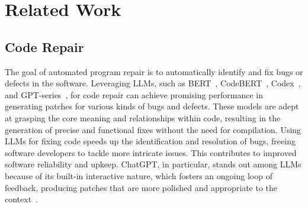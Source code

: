 \section{Related Work}
\label{section: related work}

\subsection{Code Repair} 

The goal of automated program repair is to automatically identify and fix bugs or defects in the software.
Leveraging LLMs, such as BERT~\cite{zhang2024appt}, CodeBERT~\cite{le2023invalidator}, Codex~\cite{fan2023automated,jin2023inferfix,wu2023effective}, and GPT-series~\cite{lajko2022towards,xia2023keep,xia2023conversational,sobania2023analysis}, for code repair can achieve promising performance in generating patches for various kinds of bugs and defects.
These models are adept at grasping the core meaning and relationships within code, resulting in the generation of precise and functional fixes without the need for compilation.
Using LLMs for fixing code speeds up the identification and resolution of bugs, freeing software developers to tackle more intricate issues.
This contributes to improved software reliability and upkeep.
ChatGPT, in particular, stands out among LLMs because of its built-in interactive nature, which fosters an ongoing loop of feedback, producing patches that are more polished and appropriate to the context~\cite{xia2023keep,xia2023conversational}.


